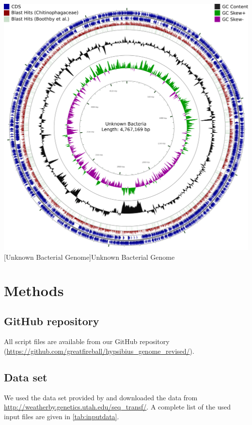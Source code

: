 \documentclass[12pt,a4paper]{scrartcl}
\begin{document}
\pagebreak

\includegraphics[width=1\textwidth]{supplementary_figure_3}
[Unknown Bacterial Genome]{Unknown Bacterial Genome}

\section{Methods}

\subsection*{GitHub repository}
All script files are available from our GitHub repository (\url{https://github.com/greatfireball/hypsibius_genome_revised/}).

\subsection*{Data set}
We used the data set provided by \textcite{Boothby2015} and downloaded the data from \url{http://weatherby.genetics.utah.edu/seq_transf/}. A complete list of the used input files are given in \cref{tab:inputdata}.
\end{document}
